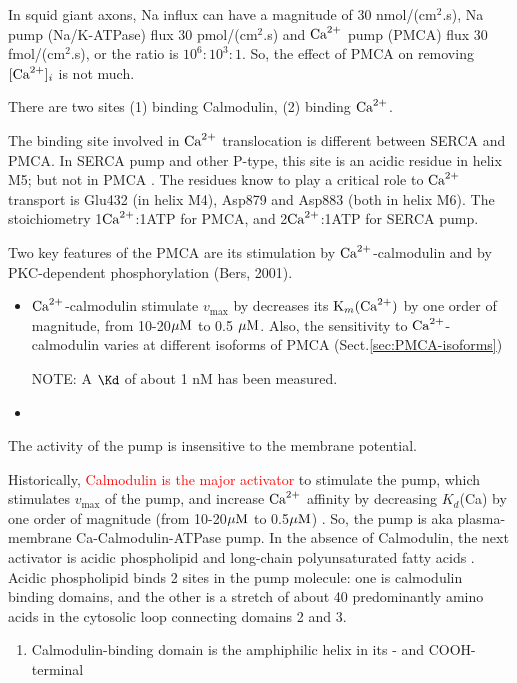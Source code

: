 \begin{mdframed}

In squid giant axons, Na influx can have a magnitude of 30 nmol/(cm$^2$.s), Na
pump (Na/K-ATPase) flux 30 pmol/(cm$^2$.s) and ${\text{Ca}^{2+}}$ pump (PMCA) flux 30
fmol/(cm$^2$.s), or the ratio is $10^6:10^3:1$. So, the effect of PMCA on
removing $[{\text{Ca}^{2+}}]_i$ is not much. 
\end{mdframed}


\begin{mdframed}
There are two sites (1) binding Calmodulin, (2) binding ${\text{Ca}^{2+}}$. 

The binding site involved in ${\text{Ca}^{2+}}$ translocation is different between SERCA and
PMCA. In SERCA pump and other P-type, this site is an acidic residue in helix
M5; but not in PMCA \citep{carafoli2000}. The residues know to play a critical
role to ${\text{Ca}^{2+}}$ transport is Glu432 (in helix M4), Asp879 and Asp883 (both in
helix M6). The stoichiometry 1${\text{Ca}^{2+}}$:1ATP for PMCA, and 2${\text{Ca}^{2+}}$:1ATP for SERCA
pump.

\end{mdframed}



Two key features of the PMCA are its stimulation by ${\text{Ca}^{2+}}$-calmodulin and by
PKC-dependent phosphorylation (Bers, 2001). 
\begin{itemize}
  \item ${\text{Ca}^{2+}}$-calmodulin stimulate $v_\max$ by decreases its ${\text{K}_m}({\text{Ca}^{2+}})$ by one
  order of magnitude, from 10-20${\mu\text{M}}$ to 0.5 ${\mu\text{M}}$. Also, the sensitivity to
  ${\text{Ca}^{2+}}$-calmodulin varies at different isoforms of PMCA
  (Sect.\ref{sec:PMCA-isoforms})

NOTE: A $\Kd$ of about 1 nM has been measured.

  
  \item 
\end{itemize}

The activity of the pump is insensitive to the membrane potential. 


Historically, \textcolor{red}{Calmodulin is the major activator} to stimulate
the pump, which stimulates $v_\max$ of the pump, and increase ${\text{Ca}^{2+}}$ affinity by
decreasing $K_d$(Ca) by one order of magnitude (from 10-20${\mu\text{M}}$ to 0.5${\mu\text{M}}$)
\citep{carafoli1994}. So, the pump is aka plasma-membrane Ca-Calmodulin-ATPase
pump. In the absence of Calmodulin, the next activator is acidic phospholipid
and long-chain polyunsaturated fatty acids \citep{ronner1977}. Acidic
phospholipid binds 2 sites in the pump molecule: one is calmodulin binding
domains, and the other is a stretch of about 40 predominantly amino acids in the
cytosolic loop connecting domains 2 and 3.
\begin{enumerate}
  \item Calmodulin-binding domain is the amphiphilic helix in its - and
  COOH-terminal
\end{enumerate}


